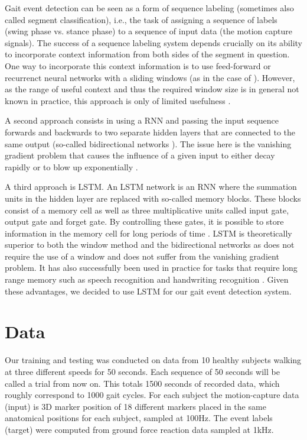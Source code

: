 \documentclass{acm_proc_article-sp}
\begin{document}
Gait event detection can be seen as a form of sequence labeling (sometimes also
called segment classification), i.e., the task of assigning a sequence of labels
(swing phase vs. stance phase) to a sequence of input data (the motion capture
signals).
The success of a sequence labeling system depends crucially on its ability to
incorporate context information from both sides of the segment in question.
%
One way to incorporate this context information is to use feed-forward or
recurrenct neural networks with a sliding windows (as in the case of
\cite{Miller2009}).
However, as the range of useful context and thus the required window size is in
general not known in practice, this approach is only of limited usefulness
\cite{Graves2012}.

A second approach consists in using a RNN and passing the
input sequence forwards and backwards to two separate hidden layers that are
connected to the same output (so-called bidirectional networks
\cite{Schuster1999}).
The issue here is the vanishing gradient problem that causes the influence of a
given input to either decay rapidly or to blow up exponentially
\cite{Hochreiter1991}.

A third approach is LSTM.
An LSTM network is an RNN where the summation units in the hidden layer are 
replaced with so-called memory blocks.
These blocks consist of a memory cell as well as three multiplicative units 
called input gate, output gate and forget gate.
By controlling these gates, it is possible to store information in the memory 
cell for long periods of time
\cite{Graves2012}.
LSTM is theoretically superior to both the window method and the bidirectional 
networks as does not require the use of a window and does not suffer 
from the vanishing gradient problem.
It has also successfully been used in practice for tasks that require long range 
memory such as speech recognition 
\cite{GravesSchmidhuber2005}
and handwriting recognition
\cite{Liwicki2007}.
Given these advantages, we decided to use LSTM for our gait event detection
system.

\section{Data}
\label{sec:Data}
Our training and testing was conducted on data from 10 healthy subjects walking at three different speeds for 50 seconds. Each sequence of 50 seconds will be called a trial from now on. This totals 1500 seconds of recorded data, which roughly correspond to 1000 gait cycles.  For each subject the motion-capture data (input) is 3D marker position of 18 different markers placed in the same anatomical positions for each subject, sampled at 100Hz. The event labels (target) were computed from ground force reaction data sampled at 1kHz.
\end{document}
